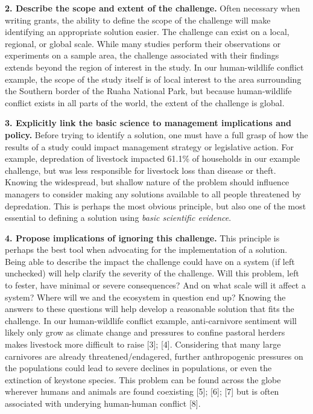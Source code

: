 \documentclass[10pt,letterpaper]{article}
\begin{document}
\textbf{2. Describe the scope and extent of the challenge.} Often
necessary when writing grants, the ability to define the scope of the
challenge will make identifying an appropriate solution easier. The
challenge can exist on a local, regional, or global scale. While many
studies perform their observations or experiments on a sample area, the
challenge associated with their findings extends beyond the region of
interest in the study. In our human-wildlife conflict example, the scope
of the study itself is of local interest to the area surrounding the
Southern border of the Ruaha National Park, but because human-wildlife
conflict exists in all parts of the world, the extent of the challenge
is global.

\textbf{3. Explicitly link the basic science to management implications
and policy.} Before trying to identify a solution, one must have a full
grasp of how the results of a study could impact management strategy or
legislative action. For example, depredation of livestock impacted
61.1\% of households in our example challenge, but was less responsible
for livestock loss than disease or theft. Knowing the widespread, but
shallow nature of the problem should influence managers to consider
making any solutions available to all people threatened by depredation.
This is perhaps the most obvious principle, but also one of the most
essential to defining a solution using \emph{basic scientific evidence}.

\textbf{4. Propose implications of ignoring this challenge.} This
principle is perhaps the best tool when advocating for the
implementation of a solution. Being able to describe the impact the
challenge could have on a system (if left unchecked) will help clarify
the severity of the challenge. Will this problem, left to fester, have
minimal or severe consequences? And on what scale will it affect a
system? Where will we and the ecosystem in question end up? Knowing the
answers to these questions will help develop a reasonable solution that
fits the challenge. In our human-wildlife conflict example,
anti-carnivore sentiment will likely only grow as climate change and
pressures to confine pastoral herders makes livestock more difficult to
raise {[}3{]}; {[}4{]}. Considering that many large carnivores are
already threatened/endagered, further anthropogenic pressures on the
populations could lead to severe declines in populations, or even the
extinction of keystone species. This problem can be found across the
globe wherever humans and animals are found coexisting {[}5{]}; {[}6{]};
{[}7{]} but is often associated with underying human-human conflict
{[}8{]}.
\end{document}
